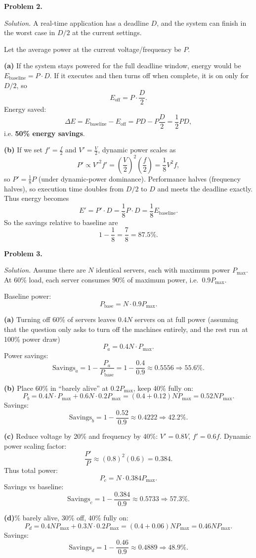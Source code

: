 \documentclass[12pt]{article}
\newcommand{\problem}[1]{\vspace{0.5em}\noindent\textbf{Problem #1.}\vspace{0.3em}}
\newenvironment{solution}{\par\noindent\textit{Solution.}}{\par\vspace{1em}}
\newcommand{\subproblem}[1]{\par\noindent\textbf{(#1)}\quad}
\begin{document}
\problem{2}
\begin{solution}
A real-time application has a deadline $D$, and the system can finish in the worst case in $D/2$ at the current settings.

Let the average power at the current voltage/frequency be $P$.

\subproblem{a}
If the system stays powered for the full deadline window, energy would be $E_{\text{baseline}}=P\cdot D$.
If it executes and then turns off when complete, it is on only for $D/2$, so
\[
E_{\text{off}}=P\cdot \frac{D}{2}.
\]
Energy saved:
\[
\Delta E = E_{\text{baseline}}-E_{\text{off}} = P D - P\frac{D}{2} = \frac{1}{2}PD,
\]
i.e. \textbf{50\% energy savings}.

\subproblem{b}
If we set $f'=\frac{f}{2}$ and $V'=\frac{V}{2}$, dynamic power scales as
\[
P' \propto V'^2 f' = \left(\frac{V}{2}\right)^2 \left(\frac{f}{2}\right) = \frac{1}{8} V^2 f,
\]
so $P'=\frac{1}{8}P$ (under dynamic-power dominance).
Performance halves (frequency halves), so execution time doubles from $D/2$ to $D$ and meets the deadline exactly.
Thus energy becomes
\[
E' = P'\cdot D = \frac{1}{8}P\cdot D = \frac{1}{8}E_{\text{baseline}}.
\]
So the savings relative to baseline are
\[
1-\frac{1}{8}=\frac{7}{8}=87.5\%.
\]


\end{solution}

\problem{3}
\begin{solution}
Assume there are $N$ identical servers, each with maximum power $P_{\max}$.
At 60\% load, each server consumes 90\% of maximum power, i.e.\ $0.9P_{\max}$.

Baseline power:
\[
P_{\text{base}} = N\cdot 0.9P_{\max}.
\]

\subproblem{a}
Turning off 60\% of servers leaves $0.4N$ servers on at full power (assuming that the question only asks to turn off the machines entirely, and the rest run at 100\% power draw)
\[
P_a = 0.4N\cdot P_{\max}.
\]
Power savings:
\[
\text{Savings}_a = 1-\frac{P_a}{P_{\text{base}}}
=1-\frac{0.4}{0.9}\approx 0.5556
\Rightarrow \boxed{55.6\%}.
\]

\subproblem{b}
Place 60\% in ``barely alive'' at $0.2P_{\max}$, keep 40\% fully on:
\[
P_b = 0.4N\cdot P_{\max} + 0.6N\cdot 0.2P_{\max}
= (0.4+0.12)NP_{\max}=0.52NP_{\max}.
\]
Savings:
\[
\text{Savings}_b = 1-\frac{0.52}{0.9}\approx 0.4222
\Rightarrow \boxed{42.2\%}.
\]

\subproblem{c}
Reduce voltage by 20\% and frequency by 40\%: $V'=0.8V$, $f'=0.6f$.
Dynamic power scaling factor:
\[
\frac{P'}{P}\approx (0.8)^2(0.6)=0.384.
\]
Thus total power:
\[
P_c = N\cdot 0.384P_{\max}.
\]
Savings vs baseline:
\[
\text{Savings}_c=1-\frac{0.384}{0.9}\approx 0.5733
\Rightarrow \boxed{57.3\%}.
\]

\subproblem{d}
30\% barely alive, 30\% off, 40\% fully on:
\[
P_d = 0.4NP_{\max}+0.3N\cdot 0.2P_{\max} = (0.4+0.06)NP_{\max}=0.46NP_{\max}.
\]
Savings:
\[
\text{Savings}_d=1-\frac{0.46}{0.9}\approx 0.4889
\Rightarrow \boxed{48.9\%}.
\]

\end{solution}
\end{document}
